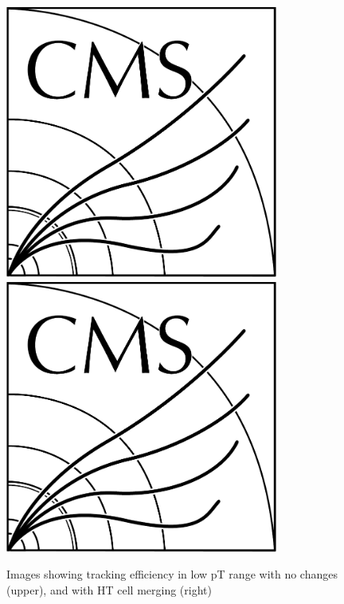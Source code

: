 \begin{figure}[tbp]
\centering
\includegraphics[width=0.8\textwidth,trim={1.1truecm 0truecm 1truecm 12truecm},clip]{CMS-bw-logo.pdf}
\includegraphics[width=0.8\textwidth,trim={0.7truecm 0truecm 1truecm 0truecm},clip]{CMS-bw-logo.pdf}
\caption{Images showing tracking efficiency in low pT range with no changes (upper), and with HT cell merging (right)}
\label{fig:2GeVFlat}
\end{figure}


